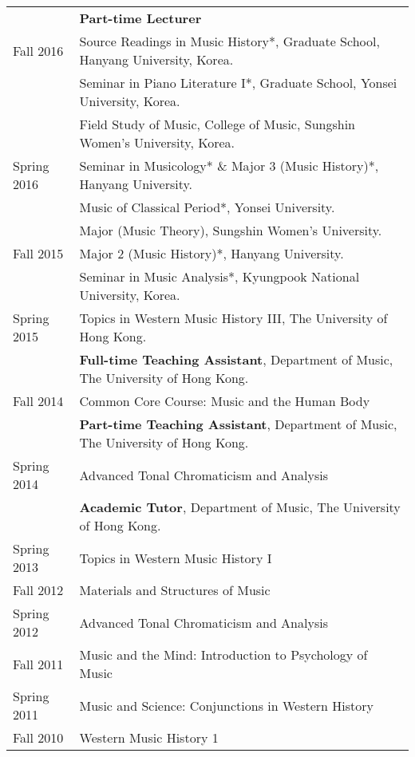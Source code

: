 \documentclass[letter,11pt,draft]{article}
\begin{document}
  \hspace*{-0.25cm}
  \begin{tabular}{p{2.5cm} l}
    & \textbf{Part-time Lecturer}\\
    Fall 2016 & Source Readings in Music History*, Graduate School, Hanyang University, Korea.\\
    & Seminar in Piano Literature I*, Graduate School, Yonsei University, Korea.\\
    & Field Study of Music, College of Music, Sungshin Women's University, Korea.\\
    
    Spring 2016 & Seminar in Musicology* \& Major 3 (Music History)*, Hanyang University.\\
    & Music of Classical Period*, Yonsei University.\\
    & Major (Music Theory), Sungshin Women's University.\\
    
    Fall 2015 & Major 2 (Music History)*, Hanyang University.\\
    & Seminar in Music Analysis*, Kyungpook National University, Korea.\\
    
    Spring 2015 & Topics in Western Music History III, The University of Hong Kong.\\[2mm]
    
    & \textbf{Full-time Teaching Assistant}, Department of Music, The University of Hong Kong.\\
    Fall 2014 & Common Core Course: Music and the Human Body\\[2mm]
    
    & \textbf{Part-time Teaching Assistant}, Department of Music, The University of Hong Kong.\\
    Spring 2014 & Advanced Tonal Chromaticism and Analysis\\[2mm]
    
    & \textbf{Academic Tutor}, Department of Music, The University of Hong Kong.\\
    Spring 2013 & Topics in Western Music History I\\
    Fall 2012 & Materials and Structures of Music\\
    Spring 2012 & Advanced Tonal Chromaticism and Analysis\\
    Fall 2011 & Music and the Mind: Introduction to Psychology of Music\\
    Spring 2011 & Music and Science: Conjunctions in Western History\\
    Fall 2010 & Western Music History 1\\[2mm]
    

\end{tabular}
\end{document}
